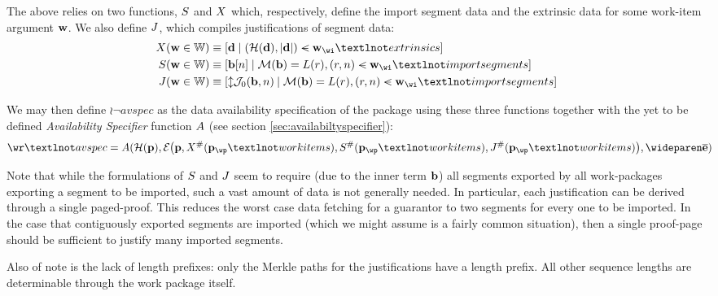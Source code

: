 The above relies on two functions, $S$ and $X$ which, respectively, define the import segment data and the extrinsic data for some work-item argument $\mathbf{w}$. We also define $J$, which compiles justifications of segment data:
\begin{equation}
  \begin{aligned}
    \extrinsicdata(\wiX \in \workitem) &\equiv \sq{\build{\mathbf{d}}{(\blake{\mathbf{d}}, \len{\mathbf{d}}) \orderedin \wiX_\wi¬extrinsics}} \\
    \importsegmentdata(\wiX \in \workitem) &\equiv \sq{\build{\segsX\subb{n}}{\merklizecd{\segsX} = \segrootlookup(r), \tup{r, n} \orderedin \wiX_\wi¬importsegments}} \\
    \justifysegmentdata(\wiX \in \workitem) &\equiv \sq{\build{\var{\merklejustsubpath{0}{\segsX, n}}}{\merklizecd{\segsX} = \segrootlookup(r), \tup{r, n} \orderedin \wiX_\wi¬importsegments}}
  \end{aligned}
\end{equation}

We may then define $\wr¬avspec$ as the data availability specification of the package using these three functions together with the yet to be defined \emph{Availability Specifier} function $A$ (see section \ref{sec:availabiltyspecifier}):
\begin{equation}
  \wr¬avspec = \newavailabilityspecifier(
    \blake{\wpX},
    \encode{
      \wpX,
      \extrinsicdata^\#(\wpX_\wp¬workitems),
      \importsegmentdata^\#(\wpX_\wp¬workitems),
      \justifysegmentdata^\#(\wpX_\wp¬workitems)
    },
    \concatall{\allexports}
  )\!\!\!\!
\end{equation}

Note that while the formulations of $S$ and $J$ seem to require (due to the inner term $\mathbf{b}$) all segments exported by all work-packages exporting a segment to be imported, such a vast amount of data is not generally needed. In particular, each justification can be derived through a single paged-proof. This reduces the worst case data fetching for a guarantor to two segments for every one to be imported. In the case that contiguously exported segments are imported (which we might assume is a fairly common situation), then a single proof-page should be sufficient to justify many imported segments.

Also of note is the lack of length prefixes: only the Merkle paths for the justifications have a length prefix. All other sequence lengths are determinable through the work package itself.

